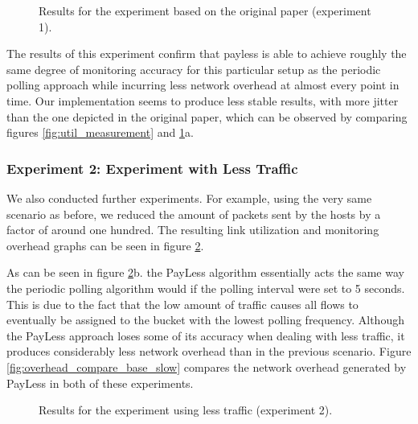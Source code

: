 \documentclass[DIV=12]{scrartcl}
\begin{document}
\begin{figure}%
    \centering
    \caption{Results for the experiment based on the original paper (experiment 1).}%
    \label{fig:experiment1}%
\end{figure}

The results of this experiment confirm that payless is able to achieve
roughly the same degree of monitoring accuracy for this particular setup as the periodic polling approach while incurring less network overhead at almost every point in time.
Our implementation seems to produce less stable results, with more jitter
than the one depicted in the original paper, which can be observed by comparing 
figures \ref{fig:util_measurement} and \ref{fig:experiment1}a.

\subsubsection{Experiment 2: Experiment with Less Traffic}

We also conducted further experiments. For example, using the very same scenario as before, we reduced the amount of packets sent by the hosts by a factor of around one hundred. The resulting link utilization and monitoring overhead graphs can be seen in figure \ref{fig:experiment2}.

As can be seen in figure \ref{fig:experiment2}b. the PayLess algorithm essentially acts the same way the periodic polling algorithm would if the polling interval were set to 5 seconds. This is due to the fact that the low amount of traffic causes all flows to eventually be assigned to the bucket with the lowest polling frequency. Although the PayLess approach loses some of its accuracy when dealing with less traffic, it produces considerably less network overhead than in the previous scenario. Figure \ref{fig:overhead_compare_base_slow} compares the network overhead generated by PayLess in both of these experiments.

\begin{figure}%
    \centering
    \caption{Results for the experiment using less traffic (experiment 2).}%
    \label{fig:experiment2}%
\end{figure}
\end{document}
